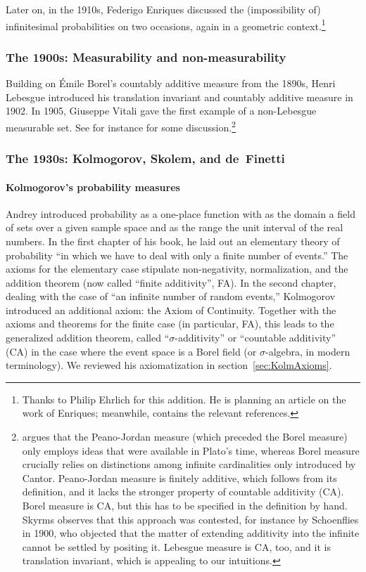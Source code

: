 Later on, in the 1910s, Federigo Enriques discussed the (impossibility of) infinitesimal probabilities on two occasions, again in a geometric context.\footnote{Thanks to Philip Ehrlich for this addition. He is planning an article on the work of Enriques; meanwhile, \citet{Ehrlich:2006} contains the relevant references.}

\subsubsection*{The 1900s: Measurability and non-measurability}
Building on {\'E}mile Borel's countably additive measure from the 1890s, Henri Lebesgue introduced his translation invariant and countably additive measure in 1902. In 1905, Giuseppe Vitali gave the first example of a non-Lebesgue measurable set. See for instance \citet{Skyrms:1983a} for some discussion.\footnote{\citet{Skyrms:1983a} argues that the Peano-Jordan measure (which preceded the Borel measure) only employs ideas that were available in Plato's time, whereas Borel measure crucially relies on distinctions among infinite cardinalities only introduced by Cantor. Peano-Jordan measure is finitely additive, which follows from its definition, and it lacks the stronger property of countable additivity (CA). Borel measure is CA, but this has to be specified in the definition by hand. Skyrms observes that this approach was contested, for instance by Schoenflies in 1900, who objected that the matter of extending additivity into the infinite cannot be settled by positing it. Lebesgue measure is CA, too, and it is translation invariant, which is appealing to our intuitions.\label{fn:Schoenflies}}

\subsubsection*{The 1930s: Kolmogorov, Skolem, and de~Finetti}

\paragraph{Kolmogorov's probability measures}\label{sec:Kolmogorov}
Andrey \citet{Kolmogorov:1933} introduced probability as a one-place function with as the domain a field of sets over a given sample space and as the range the unit interval of the real numbers. In the first chapter of his book, he laid out an elementary theory of probability ``in which we have to deal with only a finite number of events.'' The axioms for the elementary case stipulate non-negativity, normalization, and the addition theorem (now called ``finite additivity'', FA).
In the second chapter, dealing with the case of ``an infinite number of random events,'' Kolmogorov introduced an additional axiom: the Axiom of Continuity. Together with the axioms and theorems for the finite case (in particular, FA), this leads to the generalized addition theorem, called ``$\sigma $-additivity'' or ``countable additivity'' (CA) in the case where the event space is a Borel field (or $\sigma $-algebra, in modern terminology). We reviewed his axiomatization in section~\ref{sec:KolmAxioms}.


